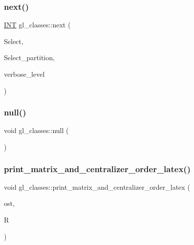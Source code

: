 \subsubsection{\texorpdfstring{next()}{next()}}
{\footnotesize\ttfamily \mbox{\hyperlink{galois_8h_a09fddde158a3a20bd2dcadb609de11dc}{I\+NT}} gl\+\_\+classes\+::next (\begin{DoxyParamCaption}\item[{\mbox{\hyperlink{galois_8h_a09fddde158a3a20bd2dcadb609de11dc}{I\+NT}} $\ast$}]{Select,  }\item[{\mbox{\hyperlink{galois_8h_a09fddde158a3a20bd2dcadb609de11dc}{I\+NT}} $\ast$}]{Select\+\_\+partition,  }\item[{\mbox{\hyperlink{galois_8h_a09fddde158a3a20bd2dcadb609de11dc}{I\+NT}}}]{verbose\+\_\+level }\end{DoxyParamCaption})}

\mbox{\label{classgl__classes_aaaf0d9229c8d3ef44b35bb592dfae392}} 
\subsubsection{\texorpdfstring{null()}{null()}}
{\footnotesize\ttfamily void gl\+\_\+classes\+::null (\begin{DoxyParamCaption}{ }\end{DoxyParamCaption})}

\mbox{\label{classgl__classes_ace5b5c0cd93656922837cef33fbf5e20}} 
\subsubsection{\texorpdfstring{print\+\_\+matrix\+\_\+and\+\_\+centralizer\+\_\+order\+\_\+latex()}{print\_matrix\_and\_centralizer\_order\_latex()}}
{\footnotesize\ttfamily void gl\+\_\+classes\+::print\+\_\+matrix\+\_\+and\+\_\+centralizer\+\_\+order\+\_\+latex (\begin{DoxyParamCaption}\item[{ofstream \&}]{ost,  }\item[{\mbox{\hyperlink{classgl__class__rep}{gl\+\_\+class\+\_\+rep}} $\ast$}]{R }\end{DoxyParamCaption})}

